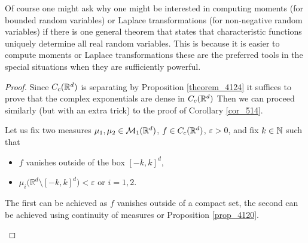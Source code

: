 Of course one might ask why one might be interested in computing moments (for bounded random variables) or Laplace transformations (for non-negative random variables) if there is one general theorem that states that characteristic functions uniquely determine all real random variables. This is because it is easier to compute moments or Laplace transformations these are the preferred tools in the special situations when they are sufficiently powerful.
\begin{proof}[Proof]
	Since $C_c(\mathbb{R}^d)$ is separating by Proposition \ref{theorem_4124} it suffices to prove that the complex exponentials are dense in $C_c(\mathbb{R}^d)$ Then we can proceed similarly (but with an extra trick) to the proof of Corollary \ref{cor_514}.\smallskip
	
	Let us fix two measures $\mu_1, \mu_2\in \mathcal{M}_1(\mathbb{R}^d)$, $f\in C_c(\mathbb{R}^d)$, $\varepsilon>0$, and fix $k\in \mathbb{N}$ such that
	\begin{itemize}
		\item $f$ vanishes outside of the box $[-k,k]^d$,
		\item $\mu_i \big( \mathbb{R}^d  \setminus [-k,k]^d \big) < \varepsilon$ or $i=1,2$.
	\end{itemize}
	The first can be achieved as $f$ vanishes outside of a compact set, the second can be achieved using continuity of measures or Proposition \ref{prop_4120}.
	\begin{figure}[h]
		\begin{center}
\end{center}
\end{figure}
\end{proof}
